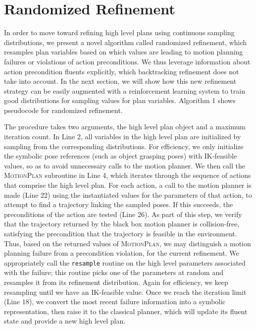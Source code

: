 \section{Randomized Refinement}
In order to move toward refining high level plans using continuous sampling distributions,
we present a novel algorithm called randomized refinement, which resamples
plan variables based on which values are leading to motion planning
failures or violations of action preconditions. We thus leverage information
about action precondition fluents explicitly, which backtracking refinement
does not take into account. In the next section, we will show how this new refinement strategy
can be easily augmented with a reinforcement learning system to train good
distributions for sampling values for plan variables. Algorithm 1 shows pseudocode
for randomized refinement.

The procedure takes two arguments, the high level plan object and a maximum
iteration count. In Line 2, all variables in the high level plan are initialized by sampling
from the corresponding distributions. For efficiency, we only initialize the symbolic pose
references (such as object grasping poses) with IK-feasible values, so as to avoid unnecessary calls to the
motion planner. We then call the \textsc{MotionPlan} subroutine in Line 4, which
iterates through the sequence of actions that comprise the high level plan.
For each action, a call to the motion planner is made (Line 22) using the instantiated values
for the parameters of that action, to attempt to find a trajectory
linking the sampled poses. If this succeeds, the preconditions of the action
are tested (Line 26). As part of this step, we verify that the trajectory returned by the
black box motion planner is collision-free, satisfying the precondition
that the trajectory is feasible in the environment. Thus, based
on the returned values of \textsc{MotionPlan}, we may distinguish
a motion planning failure from a precondition violation, for the current
refinement. We appropriately call the \texttt{resample} routine on the high level parameters
associated with the failure; this routine picks one of the parameters at random and
resamples it from its refinement distribution. Again for efficiency, we keep resampling until we
have an IK-feasible value. Once we reach the iteration limit (Line 18),
we convert the most recent failure information into a symbolic representation, then raise it
to the classical planner, which will update its fluent state and provide a new
high level plan.

